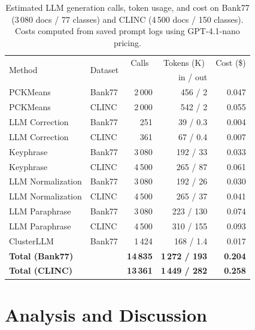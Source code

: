 \documentclass[10pt,twocolumn,a4paper]{article}
\begin{document}
\begin{table}[htbp]

\centering
\caption{Estimated LLM generation calls, token usage, and cost
  on Bank77 (3\,080 docs / 77 classes) and CLINC (4\,500 docs / 150 classes).
  Costs computed from saved prompt logs using GPT-4.1-nano pricing.}
\label{tab:cost}
\footnotesize
\setlength{\tabcolsep}{3.5pt}
\begin{tabular}{llrrr}
\toprule
\multirow{2}{*}{Method} & \multirow{2}{*}{Dataset} &
  \multicolumn{1}{c}{Calls} &
  \multicolumn{1}{c}{Tokens (K)} &
  \multicolumn{1}{c}{Cost (\$)} \\
 & & & \small in / out & \\
\midrule
PCKMeans           & Bank77 &  2\,000 & 456 / 2   & 0.047 \\
PCKMeans           & CLINC  &  2\,000 & 542 / 2   & 0.055 \\
\addlinespace
LLM Correction     & Bank77 &    251  &  39 / 0.3 & 0.004 \\
LLM Correction     & CLINC  &    361  &  67 / 0.4 & 0.007 \\
\addlinespace
Keyphrase          & Bank77 &  3\,080 & 192 / 33  & 0.033 \\
Keyphrase          & CLINC  &  4\,500 & 265 / 87  & 0.061 \\
\addlinespace
LLM Normalization  & Bank77 &  3\,080 & 192 / 26  & 0.030 \\
LLM Normalization  & CLINC  &  4\,500 & 265 / 37  & 0.041 \\
\addlinespace
LLM Paraphrase     & Bank77 &  3\,080 & 223 / 130 & 0.074 \\
LLM Paraphrase     & CLINC  &  4\,500 & 310 / 155 & 0.093 \\
\addlinespace
ClusterLLM         & Bank77 &  1\,424 & 168 / 1.4 & 0.017 \\
\midrule
\textbf{Total (Bank77)} & & \textbf{14\,835} & \textbf{1\,272 / 193} & \textbf{0.204} \\
\textbf{Total (CLINC)}  & & \textbf{13\,361} & \textbf{1\,449 / 282} & \textbf{0.258} \\
\bottomrule
\end{tabular}
\end{table}

\section{Analysis and Discussion}
\label{sec:analysis}
\end{document}
